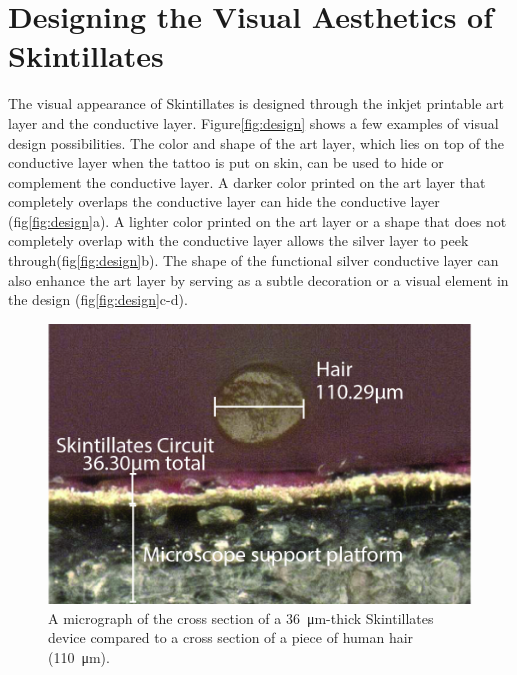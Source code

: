 \documentclass{sigchi}
\begin{document}
\section{Designing the Visual Aesthetics of Skintillates}
The visual appearance of Skintillates is designed through the inkjet printable art layer and the conductive layer. Figure\ref{fig:design} shows a few examples of visual design possibilities. The color and shape of the art layer, which lies on top of the conductive layer when the tattoo is put on skin, can be used to hide or complement the conductive layer. A darker color printed on the art layer that completely overlaps the conductive layer can hide the conductive layer (fig\ref{fig:design}a). A lighter color printed on the art layer or a shape that does not completely overlap with the conductive layer allows the silver layer to peek through(fig\ref{fig:design}b). The shape of the functional silver conductive layer can also enhance the art layer by serving as a subtle decoration or a visual element in the design (fig\ref{fig:design}c-d). 

\begin{figure}[!ht]
\centering
\includegraphics[width=1\columnwidth]{figures/Figure2}
\caption{A micrograph of the cross section of a \SI{36}{\micro\metre}-thick Skintillates device compared to a cross section of a piece of human
hair (\SI{110}{\micro\metre}).}
\vspace{-8pt}
\label{fig:micrograph}
\end{figure}
\end{document}
